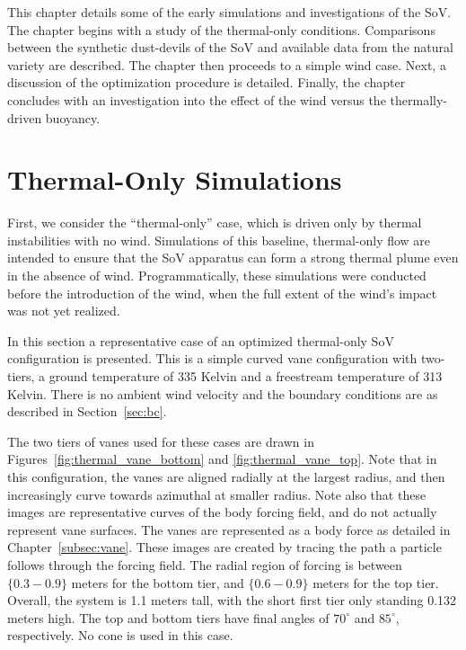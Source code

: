 \label{sec:results}

%
%
%
%

This chapter details some of the early simulations and investigations
of the SoV. The chapter begins with a study of the thermal-only
conditions. Comparisons between the synthetic dust-devils of the SoV and
available data from the natural variety are described. The chapter then
proceeds to a simple wind case. Next, a discussion of the optimization
procedure is detailed. Finally, the chapter concludes with an
investigation into the effect of the wind versus the thermally-driven buoyancy. 


\section{Thermal-Only Simulations}
\label{sec:thermal_only}


First, we consider the ``thermal-only'' case, which is 
driven only by thermal instabilities with no wind. 
Simulations of this baseline, thermal-only flow are 
intended to ensure that the SoV apparatus can
form a strong thermal plume even in the absence of
wind. Programmatically, these simulations were conducted before the
introduction of the wind, when the full extent of the wind's impact was
not yet realized. 

In this section a representative case of an optimized thermal-only SoV
configuration is presented. This is a simple curved vane configuration with
two-tiers, a ground temperature of 335 Kelvin and a freestream
temperature of 313 Kelvin. There is no ambient wind velocity and the boundary
conditions are as described in Section~\ref{sec:bc}.  

The two tiers of vanes used for these cases are drawn in
Figures~\ref{fig:thermal_vane_bottom} and \ref{fig:thermal_vane_top}.  
Note that in this configuration, the vanes are aligned radially at the
largest radius, and then increasingly curve towards azimuthal at smaller
radius. Note also that these images are representative curves of the
body forcing field, and do not actually represent vane surfaces. The
vanes are represented as a body force as detailed in
Chapter~\ref{subsec:vane}. These images are created by tracing the path
a particle follows through the forcing field. The 
radial region of forcing is between $\{0.3-0.9\}$ meters for the bottom tier,
and $\{0.6-0.9\}$ meters for the top tier. Overall, the system is 1.1
meters tall, with the short first tier only standing 0.132 meters
high. The top and bottom tiers have final angles of $70^{\circ}$ and
$85^{\circ}$, respectively. No cone is used in this case. 

